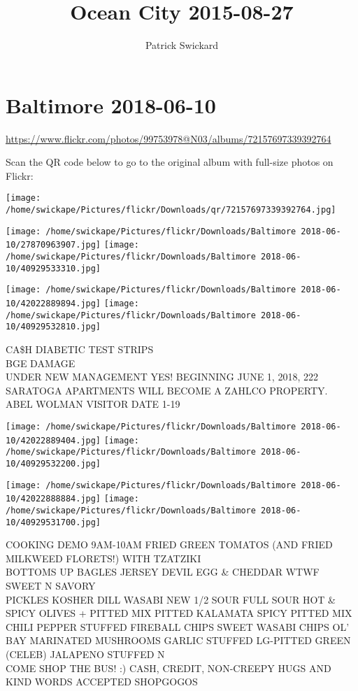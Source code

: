\documentclass[10pt,letterpaper]{article}
\title{Ocean City 2015-08-27}
\author{Patrick Swickard}
\date{}
\begin{document}
\section*{Baltimore 2018-06-10}

\url{https://www.flickr.com/photos/99753978@N03/albums/72157697339392764}

Scan the QR code below to go to the original album with full-size photos on Flickr:

\texttt{[image: /home/swickape/Pictures/flickr/Downloads/qr/72157697339392764.jpg]}
\pagebreak

\texttt{[image: /home/swickape/Pictures/flickr/Downloads/Baltimore 2018-06-10/27870963907.jpg]}
\texttt{[image: /home/swickape/Pictures/flickr/Downloads/Baltimore 2018-06-10/40929533310.jpg]}

\texttt{[image: /home/swickape/Pictures/flickr/Downloads/Baltimore 2018-06-10/42022889894.jpg]}
\texttt{[image: /home/swickape/Pictures/flickr/Downloads/Baltimore 2018-06-10/40929532810.jpg]}

CA\$H DIABETIC TEST STRIPS\\
BGE DAMAGE\\
UNDER NEW MANAGEMENT YES!  BEGINNING JUNE 1, 2018, 222 SARATOGA APARTMENTS WILL BECOME A ZAHLCO PROPERTY.\\
ABEL WOLMAN VISITOR DATE 1{-}19
\pagebreak

\texttt{[image: /home/swickape/Pictures/flickr/Downloads/Baltimore 2018-06-10/42022889404.jpg]}
\texttt{[image: /home/swickape/Pictures/flickr/Downloads/Baltimore 2018-06-10/40929532200.jpg]}

\texttt{[image: /home/swickape/Pictures/flickr/Downloads/Baltimore 2018-06-10/42022888884.jpg]}
\texttt{[image: /home/swickape/Pictures/flickr/Downloads/Baltimore 2018-06-10/40929531700.jpg]}

COOKING DEMO 9AM{-}10AM FRIED GREEN TOMATOS (AND FRIED MILKWEED FLORETS!) WITH TZATZIKI\\
BOTTOMS UP BAGLES JERSEY DEVIL EGG \& CHEDDAR WTWF SWEET N SAVORY\\
PICKLES KOSHER DILL WASABI NEW 1/2 SOUR FULL SOUR HOT \& SPICY OLIVES + PITTED MIX PITTED KALAMATA SPICY PITTED MIX CHILI PEPPER STUFFED FIREBALL CHIPS SWEET WASABI CHIPS OL' BAY MARINATED MUSHROOMS GARLIC STUFFED LG{-}PITTED GREEN (CELEB) JALAPENO STUFFED N\\
COME SHOP THE BUS!  :) CASH, CREDIT, NON{-}CREEPY HUGS AND KIND WORDS ACCEPTED SHOPGOGOS
\pagebreak
\end{document}
